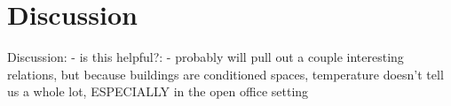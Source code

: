 \section{Discussion}

Discussion:
- is this helpful?:
    - probably will pull out a couple interesting relations, but because buildings
      are conditioned spaces, temperature doesn't tell us a whole lot, ESPECIALLY
      in the open office setting
\fi
